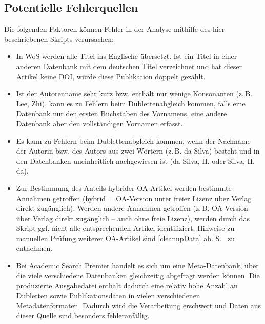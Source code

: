 \subsection{Potentielle Fehlerquellen}
\label{potentialErrors}
Die folgenden Faktoren können Fehler in der Analyse mithilfe des hier beschriebenen Skripts verursachen:
\begin{itemize}
\item In WoS werden alle Titel ins Englische übersetzt. Ist ein Titel in einer anderen Datenbank mit dem deutschen Titel verzeichnet und hat dieser Artikel keine DOI, würde diese Publikation doppelt gezählt.
\item Ist der Autorenname sehr kurz bzw. enthält nur wenige Konsonanten (z.\,B. Lee, Zhi), kann es zu Fehlern beim Dublettenabgleich kommen, falls eine Datenbank nur den ersten Buchstaben des Vornamens, eine andere Datenbank aber den vollständigen Vornamen erfasst.
\item Es kann zu Fehlern beim Dublettenabgleich kommen, wenn der Nachname der Autorin bzw. des Autors aus zwei Wörtern (z.\,B. da Silva) besteht und in den Datenbanken uneinheitlich nachgewiesen ist (da Silva, H. oder Silva, H. da).
\item Zur Bestimmung des Anteils hybrider OA-Artikel werden bestimmte Annahmen getroffen (hybrid = OA-Version unter freier Lizenz über Verlag direkt zugänglich). Werden andere Annahmen getroffen (z.\,B. OA-Version über Verlag direkt zugänglich -- auch ohne freie Lizenz), werden durch das Skript ggf. nicht alle entsprechenden Artikel identifiziert. Hinweise zu manuellen Prüfung weiterer OA-Artikel sind \ref{cleanupData} ab. S.~\pageref{cleanupData} zu entnehmen.
\item Bei Academic Search Premier handelt es sich um eine Meta-Datenbank, über die viele verschiedene Datenbanken gleichzeitig abgefragt werden können. Die produzierte Ausgabedatei enthält dadurch eine relativ hohe Anzahl an Dubletten sowie Publikationsdaten in vielen verschiedenen Metadatenformaten. Dadurch wird die Verarbeitung erschwert und Daten aus dieser Quelle sind besonders fehleranfällig.
\end{itemize}

